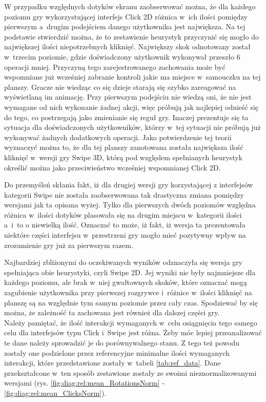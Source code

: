 \documentclass[a4paper,12pt,numbers=noenddot]{report}
\begin{document}
W przypadku względnych dotyków ekranu zaobserwować można, że dla każdego poziomu gry wykorzystującej interfejs Click 2D różnica w~ich ilości pomiędzy pierwszym a~drugim podejściem danego użytkownika jest największa. Na tej podstawie stwierdzić można, że to zestawienie heurystyk przyczynić się mogło do największej ilości niepotrzebnych kliknięć. Największy skok odnotowany został w~trzecim poziomie, gdzie doświadczony użytkownik wykonywał przeszło 6 operacji mniej. Przyczyną tego zarejestrowanego zachowania może być wspomniane już wcześniej zabranie kontroli jakie ma miejsce w~samouczku na tej planszy. Gracze nie wiedząc co się dzieje starają się szybko zareagować na wyświetlaną im animację. Przy pierwszym podejściu nie wiedzą oni, że nie jest wymagane od nich wykonanie żadnej akcji, więc próbują jak najlepiej odnieść się do tego, co postrzegają jako zmienianie się reguł gry.
Inaczej prezentuje się ta sytuacja dla doświadczonych użytkowników, którzy w~tej sytuacji nie próbują już wykonywać żadnych dodatkowych operacji. Jako potwierdzenie tej teorii wyznaczyć można to, że dla tej planszy zanotowana została największa ilość kliknięć w~wersji gry Swipe 3D, którą pod względem spełnianych heurystyk określić można jako przeciwieństwo wcześniej wspomnianej Click 2D.

Do przemyśleń skłania fakt, iż dla drugiej wersji gry korzystającej z interfejsów kategorii Swipe nie została zaobserwowana tak drastyczna zmiana pomiędzy wersjami jak ta opisana wyżej. Tylko dla pierwszych dwóch poziomów względna różnica w~ilości dotyków plasowała się na drugim miejscu w~kategorii ilości a~i~to o niewielką ilość. Oznaczać to może, iż fakt, iż wersja ta prezentowała niektóre części interfejsu w~przestrzeni gry mogło mieć pozytywny wpływ na zrozumienie gry już za pierwszym razem.

Najbardziej zbliżonymi do oczekiwanych wyników odznaczyła się wersja gry spełniająca obie heurystyki, czyli Swipe 2D. Jej wyniki nie były najmniejsze dla każdego poziomu, ale brak w~niej gwałtownych skoków, które oznaczać mogą zagubienie użytkownika przy pierwszej rozgrywce i~różnice w~ilości kliknięć na planszę są na względnie tym samym poziomie przez cały czas. Spodziewać by się można, że zależność ta zachowana jest również dla dalszej części gry.\\

Należy pamiętać, że ilość interakcji wymaganych w~celu osiągnięcia tego samego celu dla interfejsów typu Click i~Swipe jest różna. Żeby móc lepiej przeanalizować te dane należy sprowadzić je do porównywalnego stanu. Z tego też powodu zostały one podzielone przez referencyjne minimalne ilości wymaganych interakcji, które przedstawione zostały w~tabeli \ref{tab:ref_data}. Dane przekształcone w~ten sposób zestawione zostały ze swoimi nieznormalizowanymi wersjami (rys. \ref{fig:diag:rel:mean_RotationsNorm} - \ref{fig:diag:rel:mean_ClicksNorm}).
\end{document}
